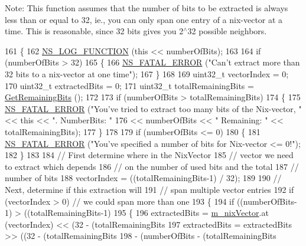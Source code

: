 Note\+: This function assumes that the number of bits to be extracted is always less than or equal to 32, ie., you can only span one entry of a nix-\/vector at a time. This is reasonable, since 32 bits gives you 2$^\wedge$32 possible neighbors. 
\begin{DoxyCode}
161 \{
162   \hyperlink{log-macros-disabled_8h_a90b90d5bad1f39cb1b64923ea94c0761}{NS\_LOG\_FUNCTION} (\textcolor{keyword}{this} << numberOfBits);
163 
164   \textcolor{keywordflow}{if} (numberOfBits > 32)
165     \{
166       \hyperlink{group__fatal_ga5131d5e3f75d7d4cbfd706ac456fdc85}{NS\_FATAL\_ERROR} (\textcolor{stringliteral}{"Can't extract more than 32 bits to a nix-vector at one time"});
167     \}
168 
169   uint32\_t vectorIndex = 0;
170   uint32\_t extractedBits = 0;
171   uint32\_t totalRemainingBits = \hyperlink{classns3_1_1NixVector_a18b56f50ce3c1df76c08f3226bbe3502}{GetRemainingBits} ();
172 
173   \textcolor{keywordflow}{if} (numberOfBits > totalRemainingBits)
174     \{
175       \hyperlink{group__fatal_ga5131d5e3f75d7d4cbfd706ac456fdc85}{NS\_FATAL\_ERROR} (\textcolor{stringliteral}{"You've tried to extract too many bits of the Nix-vector, "} << \textcolor{keyword}{this} << \textcolor{stringliteral}{
      ". NumberBits: "} 
176                       << numberOfBits << \textcolor{stringliteral}{" Remaining: "} << totalRemainingBits);
177     \}
178 
179   \textcolor{keywordflow}{if} (numberOfBits <= 0)
180     \{
181       \hyperlink{group__fatal_ga5131d5e3f75d7d4cbfd706ac456fdc85}{NS\_FATAL\_ERROR} (\textcolor{stringliteral}{"You've specified a number of bits for Nix-vector <= 0!"});
182     \}
183 
184   \textcolor{comment}{// First determine where in the NixVector }
185   \textcolor{comment}{// vector we need to extract which depends}
186   \textcolor{comment}{// on the number of used bits and the total}
187   \textcolor{comment}{// number of bits}
188   vectorIndex = ((totalRemainingBits-1) / 32);
189 
190   \textcolor{comment}{// Next, determine if this extraction will}
191   \textcolor{comment}{// span multiple vector entries}
192   \textcolor{keywordflow}{if} (vectorIndex > 0) \textcolor{comment}{// we could span more than one}
193     \{
194       \textcolor{keywordflow}{if} ((numberOfBits-1) > ((totalRemainingBits-1) %
195         \{
196           extractedBits = \hyperlink{classns3_1_1NixVector_a8e3d193156da514255bb033ceb8500df}{m\_nixVector}.at (vectorIndex) << (32 - (totalRemainingBits %
197           extractedBits = extractedBits >> ((32 - (totalRemainingBits %
198                                             - (numberOfBits - (totalRemainingBits %

\end{DoxyCode}

